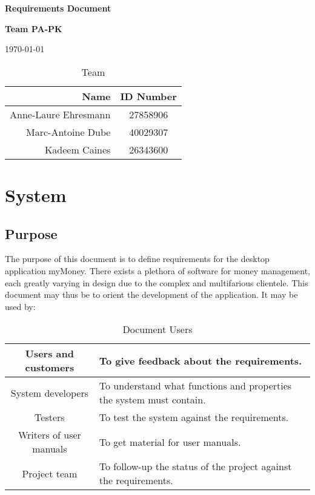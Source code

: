 \documentclass[11pt]{article}
\newcounter{use case ID}
\begin{document}
\vspace*{0.5in}
\centerline{\bf\Large Requirements Document}

\vspace*{0.5in}
\centerline{\bf\Large Team PA-PK}

\vspace*{0.5in}
\centerline{\today}

\vspace*{1.5in}
\begin{table}[htbp]
\caption{Team}
\begin{center}
\begin{tabular}{|r | c|}
\hline
Name & ID Number \\
\hline\hline
Anne-Laure Ehresmann & 27858906 \\
\hline
Marc-Antoine Dube & 40029307 \\
\hline
Kadeem Caines & 26343600 \\
\hline
\end{tabular}
\end{center}
\end{table}

\tableofcontents
\listoffigures
\listoftables

\clearpage

\section{System}\subsection{Purpose}

The purpose of this document is to define requirements for the  desktop application myMoney.
There exists a plethora of software for money management, each greatly varying in design due to the complex and multifarious clientele. This document may thus be to orient the development of the application. It may be used by:

\begin{table}[htbp]
\caption{Document Users}
\begin{center}
\begin{tabular}{|c|p{10cm}|}
\hline
Users and customers       & To give feedback about the requirements. \\
\hline
System developers         & To understand what functions and properties the system must contain. \\
\hline
Testers                   & To test the system against the requirements. \\
\hline
Writers of user manuals   & To get material for user manuals. \\
\hline
Project team              & To follow-up the status of the project against the requirements. \\
\hline
\end{tabular}
\end{center}
\end{table}
\end{document}
